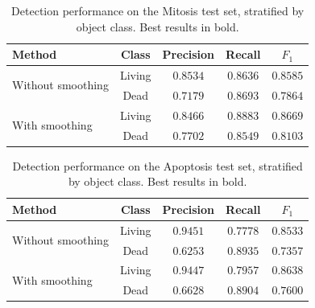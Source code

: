 \begin{table}[ht!]
\begin{center}
\begin{tabular}{|l|c|c|c|c|}
\hline
Method & Class & Precision & Recall & $F_1$\\
\hline
\multirow{2}{4em}{Without smoothing} & Living & $0.8534$ & $0.8636$ & $0.8585$ \\ 
 & Dead & $0.7179$ & $0.8693$ & $0.7864$ \\
\hline
\multirow{2}{4em}{With smoothing} & Living & $0.8466$ & $0.8883$ & $\mathbf{0.8669}$ \\ 
 & Dead & $0.7702$ & $0.8549$ & $\mathbf{0.8103}$ \\
\hline
\end{tabular}
\end{center}
\caption{Detection performance on the Mitosis test set, stratified by object class. Best results in bold.}
\label{table:mitosis}
\end{table}

\begin{table}[ht!]
\begin{center}
\begin{tabular}{|l|c|c|c|c|}
\hline
Method & Class & Precision & Recall & $F_1$\\
\hline
\multirow{2}{4em}{Without smoothing} & Living & $0.9451$ & $0.7778$ & $0.8533$ \\ 
 & Dead & $0.6253$ & $0.8935$ & $0.7357$ \\
\hline
\multirow{2}{4em}{With smoothing} & Living & $0.9447$ & $0.7957$ & $\mathbf{0.8638}$  \\ 
 & Dead & $0.6628$ & $0.8904$ & $\mathbf{0.7600}$ \\
\hline
\end{tabular}
\end{center}
\caption{Detection performance on the Apoptosis test set, stratified by object class. Best results in bold.}
\label{table:apoptosis}
\end{table}
 

